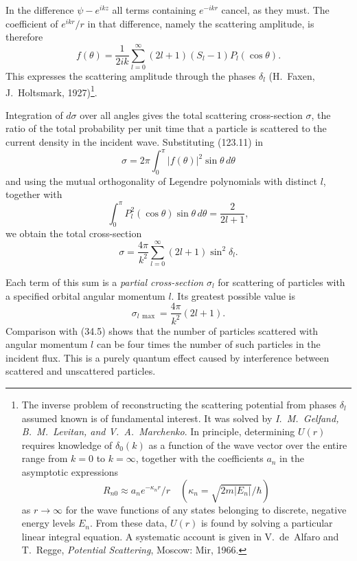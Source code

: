 In the difference $\psi-e^{ikz}$ all terms containing $e^{-ikr}$ cancel, as they must. The coefficient of $e^{ikr}/r$ in that difference, namely the scattering amplitude, is therefore
\begin{equation}
 f(\theta)=\frac1{2ik}\sum_{l=0}^\infty(2l+1)(S_l-1)P_l(\cos\theta).
 \tag{123.11}
\end{equation}
This expresses the scattering amplitude through the phases $\delta_l$ (H.~Faxen, J.~Holtsmark, 1927)\footnote{The inverse problem of reconstructing the scattering potential from phases $\delta_l$ assumed known is of fundamental interest. It was solved by \emph{I.~M.~Gelfand, B.~M.~Levitan, and V.~A.~Marchenko}. In principle, determining $U(r)$ requires knowledge of $\delta_0(k)$ as a function of the wave vector over the entire range from $k=0$ to $k=\infty$, together with the coefficients $a_n$ in the asymptotic expressions
\[
 R_{n0}\approx a_ne^{-\kappa_nr}/r
 \quad(\kappa_n=\sqrt{2m|E_n|}/\hbar)
\]
as $r\to\infty$ for the wave functions of any states belonging to discrete, negative energy levels $E_n$. From these data, $U(r)$ is found by solving a particular linear integral equation. A systematic account is given in V.~de~Alfaro and T.~Regge, \emph{Potential Scattering}, Moscow: Mir, 1966.}.

Integration of $d\sigma$ over all angles gives the total scattering cross-section $\sigma$, the ratio of the total probability per unit time that a particle is scattered to the current density in the incident wave. Substituting (123.11) in
\[
 \sigma=2\pi\int_0^\pi|f(\theta)|^2\sin\theta\,d\theta
\]
and using the mutual orthogonality of Legendre polynomials with distinct $l$, together with
\[
 \int_0^\pi P_l^2(\cos\theta)\sin\theta\,d\theta=\frac2{2l+1},
\]
we obtain the total cross-section
\begin{equation}
 \sigma=\frac{4\pi}{k^2}\sum_{l=0}^\infty(2l+1)\sin^2\delta_l.
 \tag{123.12}
\end{equation}

Each term of this sum is a \emph{partial cross-section} $\sigma_l$ for scattering of particles with a specified orbital angular momentum $l$. Its greatest possible value is
\begin{equation}
 \sigma_{l\,\max}=\frac{4\pi}{k^2}(2l+1).
 \tag{123.13}
\end{equation}
Comparison with (34.5) shows that the number of particles scattered with angular momentum $l$ can be four times the number of such particles in the incident flux. This is a purely quantum effect caused by interference between scattered and unscattered particles.

